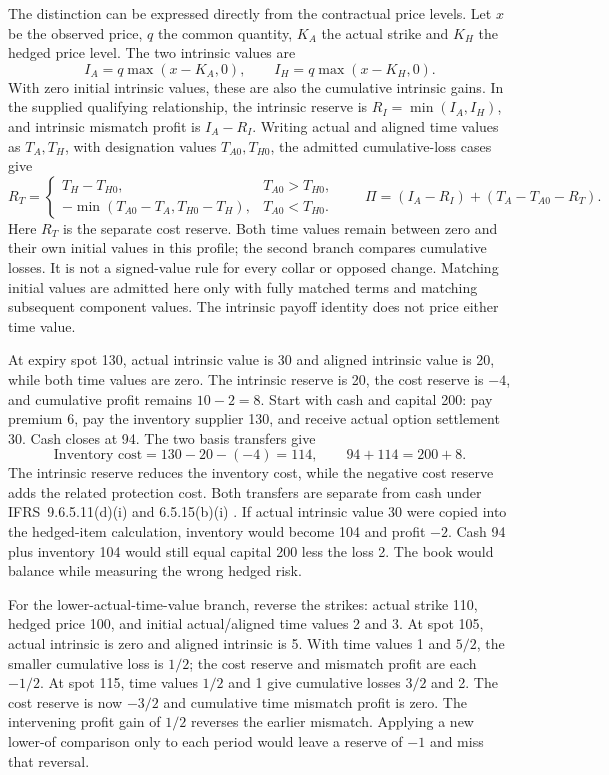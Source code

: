 The distinction can be expressed directly from the contractual price levels.
Let \(x\) be the observed price, \(q\) the common quantity, \(K_A\) the
actual strike and \(K_H\) the hedged price level. The two intrinsic values are
\[
 I_A=q\max(x-K_A,0),\qquad I_H=q\max(x-K_H,0).
\]
With zero initial intrinsic values, these are also the cumulative intrinsic
gains. In the supplied qualifying relationship, the intrinsic reserve is
\(R_I=\min(I_A,I_H)\), and intrinsic mismatch profit is \(I_A-R_I\).
Writing actual and aligned time values as \(T_A,T_H\), with designation
values \(T_{A0},T_{H0}\), the admitted cumulative-loss cases give
\[
 R_T=
 \begin{cases}
 T_H-T_{H0},&T_{A0}>T_{H0},\\
 -\min(T_{A0}-T_A,T_{H0}-T_H),&T_{A0}<T_{H0}.
 \end{cases}
 \qquad
 \Pi=(I_A-R_I)+(T_A-T_{A0}-R_T).
\]
Here \(R_T\) is the separate cost reserve. Both time values remain between
zero and their own initial values in this profile; the second branch compares
cumulative losses. It is not a signed-value rule for every collar or opposed
change. Matching initial values are admitted here only with fully matched
terms and matching subsequent component values. The intrinsic payoff identity
does not price either time value.

At expiry spot 130, actual intrinsic value is 30 and aligned intrinsic value
is 20, while both time values are zero. The intrinsic reserve is 20, the cost
reserve is \(-4\), and cumulative profit remains \(10-2=8\). Start with
cash and capital 200: pay premium 6, pay the inventory supplier 130, and receive
actual option settlement 30. Cash closes at 94. The two basis transfers give
\[
 \text{Inventory cost}=130-20-(-4)=114,\qquad
 94+114=200+8.
\]
The intrinsic reserve reduces the inventory cost, while the negative cost
reserve adds the related protection cost. Both transfers are separate from
cash under IFRS~9.6.5.11(d)(i) and 6.5.15(b)(i)
\citep[IFRS~9.6.5.11, 6.5.15]{eu20231803}. If actual intrinsic value 30
were copied into the hedged-item calculation, inventory would become 104 and
profit \(-2\). Cash 94 plus inventory 104 would still equal capital 200 less
the loss 2. The book would balance while measuring the wrong hedged risk.

For the lower-actual-time-value branch, reverse the strikes: actual strike
110, hedged price 100, and initial actual/aligned time values 2 and 3. At spot
105, actual intrinsic is zero and aligned intrinsic is 5. With time values
1 and \(5/2\), the smaller cumulative loss is \(1/2\); the cost reserve
and mismatch profit are each \(-1/2\). At spot 115, time values \(1/2\)
and 1 give cumulative losses \(3/2\) and 2. The cost reserve is now
\(-3/2\) and cumulative time mismatch profit is zero. The intervening
profit gain of \(1/2\) reverses the earlier mismatch. Applying a new
lower-of comparison only to each period would leave a reserve of \(-1\)
and miss that reversal.

